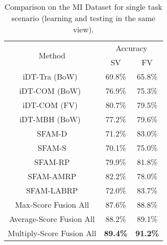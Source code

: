 \documentclass[10pt,twocolumn,letterpaper]{article}
\begin{document}
\begin{table}[!ht]
\centering
\begin{tabular}{|c|c|c|} \hline 
\multirow{2}{*}{Method} 
& \multicolumn{2}{c|}{Accuracy}\\
 \cline{2-3}   
 & SV   & FV   \\ \hline
   iDT-Tra (BoW)~\cite{liu2016benchmarking} &  69.8\%  & 65.8\% \\ \hline
   iDT-COM (BoW)~\cite{liu2016benchmarking} &  76.9\%  & 75.3\% \\ \hline
   iDT-COM (FV)~\cite{liu2016benchmarking} &  80.7\%  & 79.5\% \\ \hline
   iDT-MBH (BoW)~\cite{liu2016benchmarking} & 77.2\%  & 79.6\% \\ \hline\hline
   SFAM-D & 71.2\%  & 83.0\% \\ \hline
   SFAM-S & 70.1\%  & 75.0\% \\ \hline
   SFAM-RP & 79.9\%  & 81.8\% \\ \hline
   SFAM-AMRP & 82.2\%  & 78.0\% \\ \hline
   SFAM-LABRP & 72.0\%  & 83.7\% \\ \hline
   Max-Score Fusion All & 87.6\%  & 88.8\% \\ \hline
   Average-Score Fusion All & 88.2\%  & 89.1\% \\ \hline
   Multiply-Score Fusion All & \textbf{89.4\%}  & \textbf{91.2\%} \\ \hline
\end{tabular}
\caption{Comparison on the MI Dataset for single task scenario 
(learning and testing in the same view). \label{table2}}
\end{table}
\end{document}
